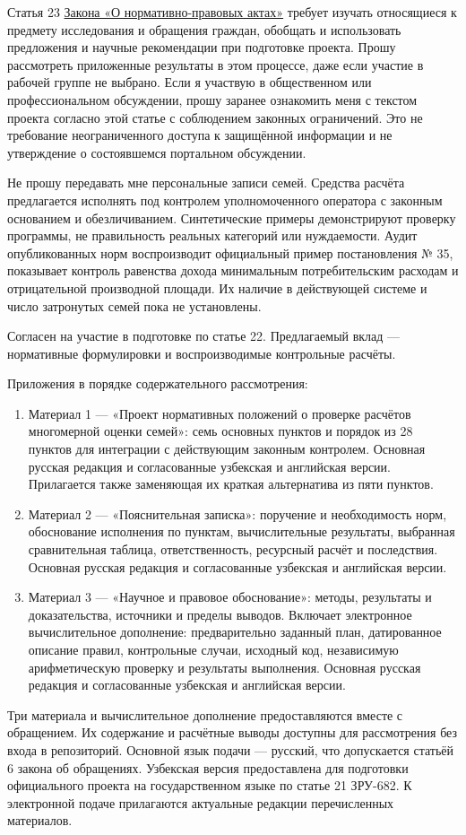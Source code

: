 \documentclass[14pt,a4paper]{extarticle}
\begin{document}
Статья 23 \href{https://lex.uz/docs/-5378966}{Закона «О нормативно-правовых актах»} требует изучать относящиеся к предмету исследования и обращения граждан, обобщать и использовать предложения и научные рекомендации при подготовке проекта. Прошу рассмотреть приложенные результаты в этом процессе, даже если участие в рабочей группе не выбрано. Если я участвую в общественном или профессиональном обсуждении, прошу заранее ознакомить меня с текстом проекта согласно этой статье с соблюдением законных ограничений. Это не требование неограниченного доступа к защищённой информации и не утверждение о состоявшемся портальном обсуждении.

Не прошу передавать мне персональные записи семей. Средства расчёта предлагается исполнять под контролем уполномоченного оператора с законным основанием и обезличиванием. Синтетические примеры демонстрируют проверку программы, не правильность реальных категорий или нуждаемости. Аудит опубликованных норм воспроизводит официальный пример постановления № 35, показывает контроль равенства дохода минимальным потребительским расходам и отрицательной производной площади. Их наличие в действующей системе и число затронутых семей пока не установлены.

Согласен на участие в подготовке по статье 22. Предлагаемый вклад — нормативные формулировки и воспроизводимые контрольные расчёты.

Приложения в порядке содержательного рассмотрения:
\begin{enumerate}
\item Материал 1 — «Проект нормативных положений о проверке расчётов многомерной оценки семей»: семь основных пунктов и порядок из 28 пунктов для интеграции с действующим законным контролем. Основная русская редакция и согласованные узбекская и английская версии. Прилагается также заменяющая их краткая альтернатива из пяти пунктов.
\item Материал 2 — «Пояснительная записка»: поручение и необходимость норм, обоснование исполнения по пунктам, вычислительные результаты, выбранная сравнительная таблица, ответственность, ресурсный расчёт и последствия. Основная русская редакция и согласованные узбекская и английская версии.
\item Материал 3 — «Научное и правовое обоснование»: методы, результаты и доказательства, источники и пределы выводов. Включает электронное вычислительное дополнение: предварительно заданный план, датированное описание правил, контрольные случаи, исходный код, независимую арифметическую проверку и результаты выполнения. Основная русская редакция и согласованные узбекская и английская версии.
\end{enumerate}
Три материала и вычислительное дополнение предоставляются вместе с обращением. Их содержание и расчётные выводы доступны для рассмотрения без входа в репозиторий. Основной язык подачи — русский, что допускается статьёй 6 закона об обращениях. Узбекская версия предоставлена для подготовки официального проекта на государственном языке по статье 21 ЗРУ-682. К электронной подаче прилагаются актуальные редакции перечисленных материалов.
\end{document}
